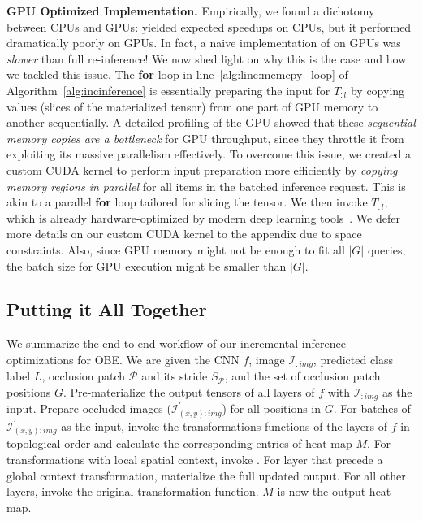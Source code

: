 \vspace{2mm}
\noindent \textbf{GPU Optimized Implementation.}
Empirically, we found a dichotomy between CPUs and GPUs:  yielded expected speedups on CPUs, but it performed dramatically poorly on GPUs. In fact, a naive implementation of  on GPUs was \textit{slower} than full re-inference! We now shed light on why this is the case and how we tackled this issue. The \textbf{for} loop in line~\ref{alg:line:memcpy_loop} of Algorithm~\ref{alg:incinference} is essentially preparing the input for $T_{:l}$ by copying values (slices of the materialized tensor) from one part of GPU memory to another sequentially. A detailed profiling of the GPU showed that these \textit{sequential memory copies are a bottleneck} for GPU throughput, since they throttle it from exploiting its massive parallelism effectively. To overcome this issue, we created a custom CUDA kernel to perform input preparation more efficiently by \textit{copying memory regions in parallel} for all items in the batched inference request. This is akin to a parallel \textbf{for} loop tailored for slicing the tensor. We then invoke $T_{:l}$, which is already hardware-optimized by modern deep learning tools~\cite{chetlur2014cudnn}. We defer more details on our custom CUDA kernel to the appendix due to space constraints. Also, since GPU memory might not be enough to fit all $|G|$ queries, the batch size for GPU execution might be smaller than $|G|$.


\vspace{-2mm}
\subsection{Putting it All Together}

We summarize the end-to-end workflow of our incremental inference optimizations for OBE. We are given the CNN $f$, image $\mathcal{I}_{:img}$, predicted class label $L$, occlusion patch $\mathcal{P}$ and its stride $S_{\mathcal{P}}$, and the set of occlusion patch positions $G$. Pre-materialize the output tensors of all layers of $f$ with $\mathcal{I}_{:img}$ as the input. Prepare occluded images ($\mathcal{I}^{'}_{(x,y):img}$) for all positions in $G$. For batches of $\mathcal{I}^{'}_{(x,y):img}$ as the input, invoke the transformations functions of the layers of $f$ in topological order and calculate the corresponding entries of heat map $M$. 
For transformations with local spatial context, invoke . For layer that precede a global context transformation, materialize the full updated output. For all other layers, invoke the original transformation function. $M$ is now the output heat map.


